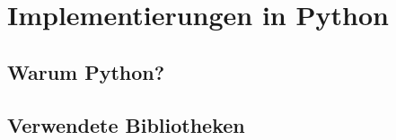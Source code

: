 \chapter{Implementierungen in Python}

\section{Warum Python?}

\section{Verwendete Bibliotheken}




